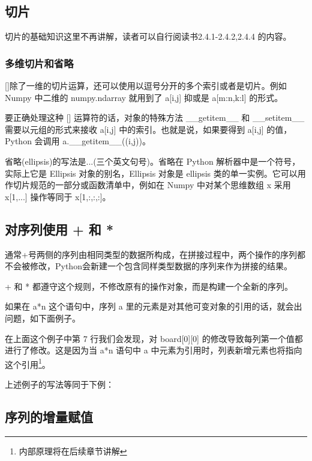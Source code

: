 \subsection{切片}

切片的基础知识这里不再讲解，读者可以自行阅读书2.4.1-2.4.2,2.4.4 的内容。

\subsubsection{多维切片和省略}

[]除了一维的切片运算，还可以使用以逗号分开的多个索引或者是切片。例如 Numpy 中二维的 numpy.ndarray 就用到了 a[i,j] 抑或是 a[m:n,k:l] 的形式。

要正确处理这种 [] 运算符的话，对象的特殊方法 \_\_getitem\_\_ 和 \_\_setitem\_\_ 需要以元组的形式来接收 a[i,j] 中的索引。也就是说，如果要得到 a[i,j] 的值，Python 会调用 a.\_\_getitem\_\_((i,j))。

省略(ellipsis)的写法是...(三个英文句号)。省略在 Python 解析器中是一个符号，实际上它是 Ellipsis 对象的别名，Ellipsis 对象是 ellipsis 类的单一实例。它可以用作切片规范的一部分或函数清单中，例如在 Numpy 中对某个思维数组 x 采用 x[1,...] 操作等同于 x[1,:,:,:]。

\subsection{对序列使用 + 和 *}

通常+号两侧的序列由相同类型的数据所构成，在拼接过程中，两个操作的序列都不会被修改，Python会新建一个包含同样类型数据的序列来作为拼接的结果。

+ 和 * 都遵守这个规则，不修改原有的操作对象，而是构建一个全新的序列。

如果在 a*n 这个语句中，序列 a 里的元素是对其他可变对象的引用的话，就会出问题，如下面例子。



在上面这个例子中第 7 行我们会发现，对 board[0][0] 的修改导致每列第一个值都进行了修改。这是因为当 a*n 语句中 a 中元素为引用时，列表新增元素也将指向这个引用\footnote{内部原理将在后续章节讲解}。

上述例子的写法等同于下例：



\subsection{序列的增量赋值}

